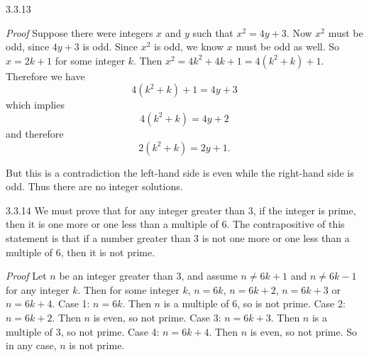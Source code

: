 \documentclass[11pt,]{book}
\makeatletter
\theoremstyle{ptxplainnotitle}
\theoremstyle{ptxplaintitle}
\renewcommand*{\proofname}{Proof}
\renewenvironment{proof}[1][\proofname]{\par
  \pushQED{\qed}%
  \normalfont \topsep6\p@\@plus6\p@\relax
  \trivlist
  \item\relax
    {\itshape
    #1\@addpunct{.}}\hspace\labelsep\ignorespaces
}{%
  \popQED\endtrivlist\@endpefalse
}
\theoremstyle{ptxdefinitionnotitle}
\theoremstyle{ptxdefinitiontitle}
\theoremstyle{ptxdefinitionnotitle}
\theoremstyle{ptxdefinitiontitle}
\theoremstyle{ptxdefinitionnotitle}
\theoremstyle{ptxdefinitiontitle}
\theoremstyle{ptxdefinitiontitlenonumber}
\theoremstyle{ptxdefinitiontitlenonumber}
\numberwithin{equation}{chapter}
\makeatother
\begin{document}
\begin{divisionexercise}{3.3.13}
\textbf{}\begin{proof}\hypertarget{proof-39}{}
\hypertarget{p-2437}{}%
Suppose there were integers \(x\) and \(y\) such that \(x^2 = 4y + 3\). Now \(x^2\) must be odd, since \(4y + 3\) is odd. Since \(x^2\) is odd, we know \(x\) must be odd as well. So \(x = 2k + 1\) for some integer \(k\). Then \(x^2 = 4k^2 + 4k + 1 = 4(k^2 + k) + 1\). Therefore we have%
\begin{equation*}
4(k^2 + k) + 1 = 4y + 3
\end{equation*}
which implies%
\begin{equation*}
4(k^2 + k) = 4y + 2
\end{equation*}
and therefore%
\begin{equation*}
2(k^2 + k) = 2y + 1.
\end{equation*}
%
\par
\hypertarget{p-2438}{}%
But this is a contradiction \textendash{} the left-hand side is even while the right-hand side is odd.  Thus there are no integer solutions.%
\end{proof}
\end{divisionexercise}%
\begin{divisionexercise}{3.3.14}
\textbf{}\hypertarget{p-2441}{}%
We must prove that for any integer greater than 3, if the integer is prime, then it is one more or one less than a multiple of 6. The contrapositive of this statement is that if a number greater than 3 is not one more or one less than a multiple of 6, then it is not prime.%
\begin{proof}\hypertarget{proof-40}{}
\hypertarget{p-2442}{}%
Let \(n\) be an integer greater than 3, and assume \(n \ne 6k+1\) and \(n \ne 6k-1\) for any integer \(k\). Then for some integer \(k\), \(n = 6k\), \(n = 6k+2\), \(n = 6k+3\) or \(n = 6k+4\). Case 1: \(n = 6k\). Then \(n\) is a multiple of 6, so is not prime. Case 2: \(n = 6k+2\). Then \(n\) is even, so not prime. Case 3: \(n = 6k+3\). Then \(n\) is a multiple of 3, so not prime. Case 4: \(n = 6k+4\). Then \(n\) is even, so not prime. So in any case, \(n\) is not prime.%
\end{proof}
\end{divisionexercise}%
\end{document}
